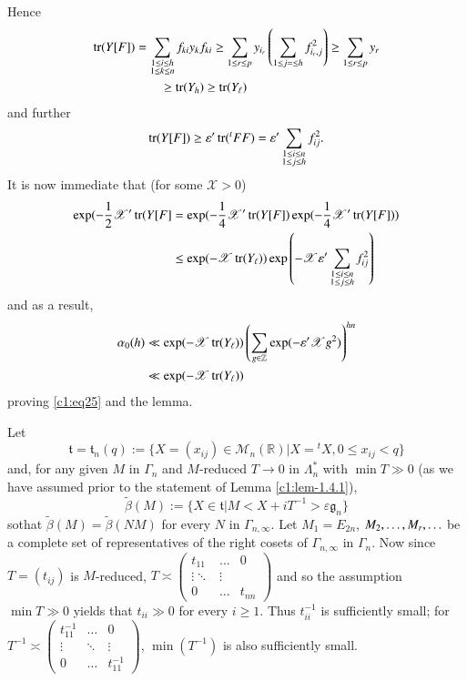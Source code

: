 Hence
\begin{align*}
\operatorname{tr}(Y[F])&=\sum_{\substack{1\leq i\leq h\\ 1\leq k\leq
    n}}f_{ki}y_{k}f_{ki}\geq \sum\limits_{1\leq r\leq
  p}y_{i_{r}}\left(\sum_{1\leq j= \leq h}f^{2}_{i_{r},j}\right)\geq
\sum_{1\leq r\leq p}y_{r}\\
&\qquad\geq \operatorname{tr}(Y_{h})\geq \operatorname{tr}(Y_{\ell}) 
\end{align*}
and further 
$$
\operatorname{tr}(Y[F])\geq \varepsilon'\operatorname{tr}({}^{t}FF) = \varepsilon'\sum_{\substack{1\leq
    i\leq n\\ 1\leq j\leq h}}f^{2}_{ij}.
$$
It is now immediate that (for some $\mathscr{X}>0$)
\begin{align*}
\exp(-\frac{1}{2}\mathscr{X}'\operatorname{tr}(Y[F] &=
\exp(-\frac{1}{4}\mathscr{X}'\operatorname{tr}(Y[F])\exp
(-\frac{1}{4}\mathscr{X}'\operatorname{tr}(Y[F]))\\
&\leq
\exp(-\mathscr{X}\operatorname{tr}(Y_{\ell}))\exp\left(-\mathscr{X}\varepsilon'\sum_{\substack{1\leq i\leq n\\ 1\leq j\leq h}}f^{2}_{ij}\right)
\end{align*}
and as a result,
\begin{align*}
\alpha_{0}(h) &\ll \exp(-\mathscr{X}\operatorname{tr}(Y_{\ell}))\left(\sum_{g\in
  \mathbb{Z}}\exp(-\varepsilon'\mathscr{X}g^{2})\right)^{hn}\\
&\ll \exp(-\mathscr{X}\operatorname{tr}(Y_{\ell}))
\end{align*}
proving \eqref{c1:eq25} and the lemma.

Let
$$
\mathfrak{t}=\mathfrak{t}_{n}(q):=\{X=(x_{ij})\in\mathscr{M}_{n}(\mathbb{R})|X={}^{t}X,
0\leq x_{ij}<q\}
$$
and, for any given $M$ in $\Gamma_{n}$ and $M$-reduced $T\to 0$ in
$\Lambda^{\ast}_{n}$ with $\min T\gg 0$ (as we have assumed prior to
the statement of Lemma \ref{c1:lem-1.4.1}),
$$
\tilde{\beta}(M):=\{X\in\mathfrak{t}|M<X+iT^{-1}>\varepsilon\mathfrak{g}_{n}\} 
$$
so\pageoriginale that $\tilde{\beta}(M)=\tilde{\beta}(NM)$ for every $N$ in
$\Gamma_{n,\infty}$. Let $M_{1}=E_{2n}$, $M_{2},\ldots,\break M_{r},\ldots$
be a complete set of representatives of the right cosets of
$\Gamma_{n,\infty}$ in $\Gamma_{n}$. Now since $T=(t_{ij})$ is
$M$-reduced, $T\asymp \left(\begin{smallmatrix} t_{11} & \ldots & 0\\ \vdots
  \ddots & \vdots\\ 0 & \ldots & t_{nn}
\end{smallmatrix}\right)$ and so the assumption $\min T\gg 0$ yields
that $t_{ii}\gg 0$ for every $i\geq 1$. Thus $t^{-1}_{ii}$ is
sufficiently small; for $T^{-1}\asymp \left(\begin{smallmatrix}
  t^{-1}_{11} & \ldots & 0\\ \vdots & \ddots & \vdots\\ 0 & \ldots &
  t^{-1}_{11} \end{smallmatrix}\right)$, $\min(T^{-1})$ is also
sufficiently small.


